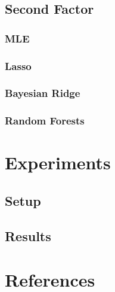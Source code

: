 \documentclass[11pt]{article}
\begin{document}
\subsection{Second Factor}
\subsubsection{MLE}
\subsubsection{Lasso}
\subsubsection{Bayesian Ridge}
\subsubsection{Random Forests}

\section{Experiments}
\subsection{Setup}
\subsection{Results}


\section{References}
\end{document}
